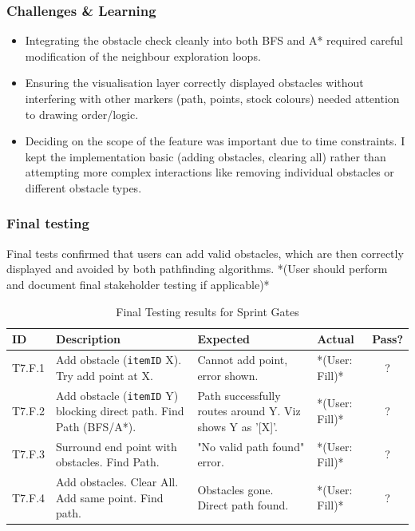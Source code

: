 \subsubsection{Challenges \& Learning}
\begin{itemize}
	\item Integrating the obstacle check cleanly into both BFS and A* required careful modification of the neighbour exploration loops.
	\item Ensuring the visualisation layer correctly displayed obstacles without interfering with other markers (path, points, stock colours) needed attention to drawing order/logic.
	\item Deciding on the scope of the feature was important due to time constraints. I kept the implementation basic (adding obstacles, clearing all) rather than attempting more complex interactions like removing individual obstacles or different obstacle types.
\end{itemize}

\subsubsection{Final testing}
Final tests confirmed that users can add valid obstacles, which are then correctly displayed and avoided by both pathfinding algorithms.
*(User should perform and document final stakeholder testing if applicable)*

\begin{table}[htbp] %
	\centering
	\begin{tabularx}{\textwidth}{|l|X|p{3.5cm}|p{3.5cm}|c|}
		\hline
		\textbf{ID} & \textbf{Description} & \textbf{Expected} & \textbf{Actual} & \textbf{Pass?} \\
		\hline
		T7.F.1 & Add obstacle (\verb|itemID| X). Try add point at X. & Cannot add point, error shown. & *(User: Fill)* & ? \\
		\hline
		T7.F.2 & Add obstacle (\verb|itemID| Y) blocking direct path. Find Path (BFS/A*). & Path successfully routes around Y. Viz shows Y as '[X]'. & *(User: Fill)* & ? \\
		\hline
		T7.F.3 & Surround end point with obstacles. Find Path. & "No valid path found" error. & *(User: Fill)* & ? \\
		\hline
		T7.F.4 & Add obstacles. Clear All. Add same point. Find path. & Obstacles gone. Direct path found. & *(User: Fill)* & ? \\
		\hline
	\end{tabularx}
	\caption{Final Testing results for Sprint Gates}
\end{table}


